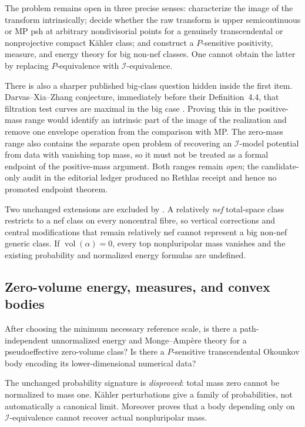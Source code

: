 The problem remains open in three precise senses: characterize the image of
the transform intrinsically; decide whether the raw transform is upper
semicontinuous or MP psh at arbitrary nondivisorial points for a genuinely
transcendental or nonprojective compact K\"ahler class; and construct a
\(P\)-sensitive positivity,
measure, and energy theory for big non-nef classes.  One cannot obtain the
latter by replacing \(P\)-equivalence with \(\mathcal I\)-equivalence.

There is also a sharper published big-class question hidden inside the first
item.  Darvas--Xia--Zhang conjecture, immediately before their
Definition~4.4, that filtration test curves are maximal in the big case
\cite{DXZ23}.  Proving this in the positive-mass range would identify an
intrinsic part of the image of the realization and remove one envelope
operation from the comparison with MP.  The zero-mass range also contains
the separate open problem of recovering an \(\mathcal I\)-model potential
from data with vanishing top mass, so it must not be treated as a formal
endpoint of the positive-mass argument.  Both ranges remain \emph{open};
the candidate-only audit in the editorial ledger produced no Rethlas
receipt and hence no promoted endpoint theorem.

Two unchanged extensions are excluded by
.
A relatively \emph{nef} total-space class restricts to a nef class on every
noncentral fibre, so vertical corrections and central modifications that
remain relatively nef cannot represent a big non-nef generic class.  If
\(\operatorname{vol}(\alpha)=0\), every top nonpluripolar mass vanishes and
the existing probability and normalized energy formulas are undefined.

\subsection{Zero-volume energy, measures, and convex bodies}

\begin{problem}\label{prob:frontier-zero-volume}
After choosing the minimum necessary reference scale, is there a
path-independent unnormalized energy and Monge--Ampère theory for a
pseudoeffective zero-volume class?  Is there a \(P\)-sensitive
transcendental Okounkov body encoding its lower-dimensional numerical data?
\end{problem}

The unchanged probability signature is \emph{disproved}: total mass zero
cannot be normalized to mass one.  Kähler perturbations give a family of
probabilities, not automatically a canonical limit.  Moreover
 proves that a body depending only on
\(\mathcal I\)-equivalence cannot recover actual nonpluripolar mass.

